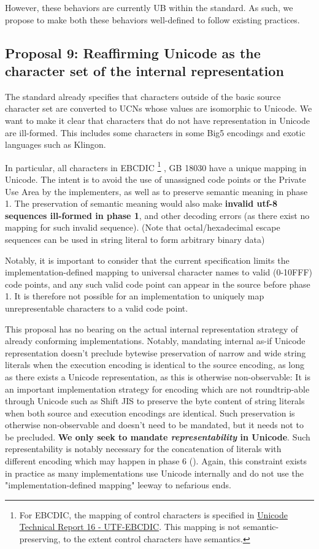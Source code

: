 \documentclass{wg21}
\begin{document}
However, these behaviors are currently UB within the standard.
As such, we propose to make both these behaviors well-defined to follow existing practices. 


\subsection{Proposal 9: Reaffirming Unicode as the character set of the internal representation}

The standard already specifies that characters outside of the basic source character set are converted to UCNs whose values are isomorphic to
Unicode.
We want to make it clear that characters that do not have representation in Unicode are ill-formed.
This includes some characters in some Big5 encodings and exotic languages such as Klingon.

In particular, all characters in EBCDIC
\footnote{For EBCDIC, the mapping of control characters is specified in \href{http://www.unicode.org/reports/tr16/tr16-8.html}{Unicode Technical Report 16 - UTF-EBCDIC}.
This mapping is not semantic-preserving, to the extent control characters have semantics.
}
, GB 18030 have a unique mapping in Unicode.
The intent is to avoid the use of unassigned code points or the Private Use Area by the implementers, as well as to preserve semantic meaning in phase 1.
The preservation of semantic meaning would also make \textbf{invalid utf-8 sequences ill-formed in phase 1}, and other decoding errors (as there exist no mapping for such invalid sequence).
(Note that octal/hexadecimal escape sequences can be used in string literal to form arbitrary binary data)


Notably, it is important to consider that the current specification limits the implementation-defined mapping to universal character names to  valid (0-10FFF) code points,
and any such valid code point can appear in the source before phase 1.
It is therefore not possible for an implementation to uniquely map unrepresentable characters to a valid code point.

This proposal has no bearing on the actual internal representation strategy of already conforming implementations. Notably, mandating internal as-if Unicode representation doesn't
preclude bytewise preservation of narrow and wide string literals when the execution encoding is identical to the source encoding,  as long as there exists a Unicode representation,
as this is otherwise non-observable: It is an important implementation strategy for encoding which are not roundtrip-able through Unicode such as Shift JIS 
to preserve the byte content of string literals when both source and execution encodings are identical.
Such preservation is otherwise non-observable and doesn't need to be mandated, but it needs not to be precluded.
\textbf{We only seek to mandate \emph{representability} in Unicode}. Such representability is notably necessary for the concatenation of literals with different encoding which may happen in phase 6 ().
Again, this constraint exists in practice as many implementations use Unicode internally and do not use the "implementation-defined mapping" leeway
to nefarious ends.
\end{document}
